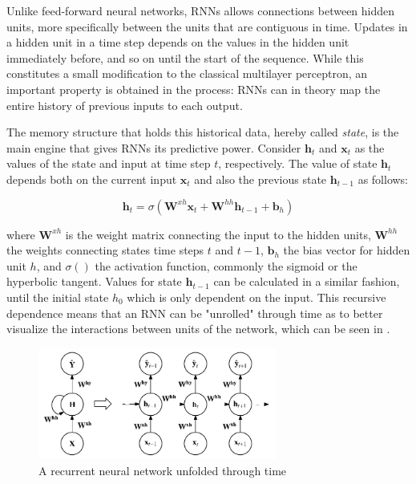 \documentclass{kththesis}
\begin{document}
Unlike feed-forward neural networks, RNNs allows connections between hidden units, more specifically between the units that are contiguous in time. Updates in a hidden unit in a time step depends on the values in the hidden unit immediately before, and so on until the start of the sequence. While this constitutes a small modification to the classical multilayer perceptron, an important property is obtained in the process: RNNs can in theory map the entire history of previous inputs to each output. 

The memory structure that holds this historical data, hereby called \emph{state}, is the main engine that gives RNNs its predictive power. Consider $\mathbf{h}_t$ and $\mathbf{x}_t$ as the values of the state and input at time step $t$, respectively. The value of state $\mathbf{h}_t$ depends both on the current input $\mathbf{x}_t$ and also the previous state $\mathbf{h}_{t-1}$ as follows:

\begin{equation}
\mathbf{h}_t = \sigma(\mathbf{W}^{xh}\mathbf{x}_t + \mathbf{W}^{hh}\mathbf{h}_{t-1} + \mathbf{b}_h)
\end{equation}

where $\mathbf{W}^{xh}$ is the weight matrix connecting the input to the hidden units, $\mathbf{W}^{hh}$ the weights connecting states time steps $t$ and $t-1$, $\mathbf{b}_h$ the bias vector for hidden unit $h$, and $\sigma()$ the activation function, commonly the sigmoid or the hyperbolic tangent. Values for state $\mathbf{h}_{t-1}$ can be calculated in a similar fashion, until the initial state $h_0$ which is only dependent on the input. This recursive dependence means that an RNN can be "unrolled" through time as to better visualize the interactions between units of the network, which can be seen in .

\begin{figure}[h]
    \centering
    \includegraphics[width=0.7\textwidth,keepaspectratio]{figures/rnn.pdf}
    \caption{A recurrent neural network unfolded through time}
    \label{fig:rnn}
\end{figure}
\end{document}
